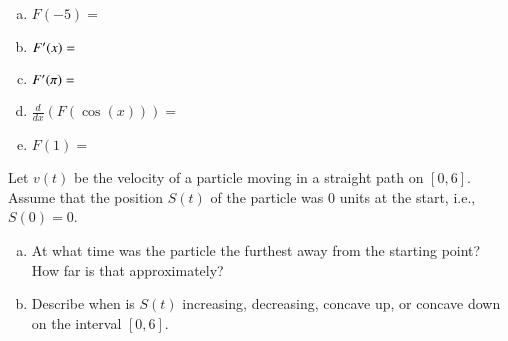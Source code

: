\documentclass[11 pt]{exam}
\begin{document}
\begin{questions}
\begin{enumerate}[(a)]
 	\item $F(-5) = $
 	
 	\hfill \break
 	
 	\item $F\rq{}(x) = $\\
 	
 	\item $F\rq{}(\pi) = $
 	
 	\hfill \break
 	
 	\item $\displaystyle \frac{d}{dx}\left(F(\cos(x))\right) = $
 	
 	\hfill \break
 	
 	
 	\item $F(1) = $
 	
\newpage
 	
 \end{enumerate}
 
 \question[12] Let $v(t)$ be the velocity of a particle moving in a straight path on $[0,6]$. Assume that the position $S(t)$ of the particle was 0 units at the start, i.e., $S(0) = 0$. 
 
 \begin{center}
 	
 	
 \end{center}
 
 \begin{enumerate}[(a)]
 	
 	
 	\item At what time was the particle the furthest away from the starting point? How far is that approximately?
 	
 	\hfill \break
 	\hfill \break
 	\hfill \break
 	\hfill \break
\hfill \break
\hfill \break 	
 	
 	\item Describe when is $S(t)$ increasing, decreasing, concave up, or concave down on the interval $[0,6]$.
 	

\end{enumerate}
\end{questions}
\end{document}
